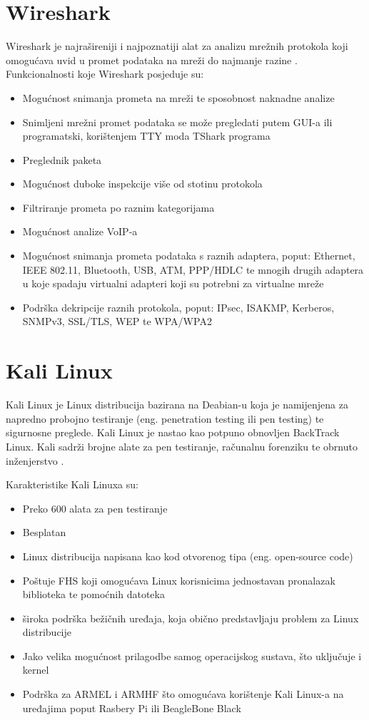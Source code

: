 \documentclass[12pt, oneside, onecolumn]{book}
\begin{document}
{\pagebreak

\section{Wireshark}

Wireshark je najrašireniji i najpoznatiji alat za analizu mrežnih protokola koji omogućava uvid u promet podataka na mreži do najmanje razine \cite{wsh}. Funkcionalnosti koje Wireshark posjeduje su:

\begin{itemize}
\item Mogućnost snimanja prometa na mreži te sposobnost naknadne analize
\item Snimljeni mrežni promet podataka se može pregledati putem GUI-a ili programatski, korištenjem TTY moda TShark programa
\item Preglednik paketa
\item Mogućnost duboke inspekcije više od stotinu protokola
\item Filtriranje prometa po raznim kategorijama
\item Mogućnost analize VoIP-a
\item Mogućnost snimanja prometa podataka s raznih adaptera, poput: Ethernet, IEEE 802.11, Bluetooth, USB, ATM, PPP/HDLC te mnogih drugih adaptera u koje spadaju virtualni adapteri koji su potrebni za virtualne mreže
\item Podrška dekripcije raznih protokola, poput: IPsec, ISAKMP, Kerberos, SNMPv3, SSL/TLS, WEP te WPA/WPA2
\end{itemize}

\pagebreak

\section{Kali Linux}
Kali Linux je Linux distribucija bazirana na Deabian-u koja je namijenjena za napredno probojno testiranje (eng. penetration testing ili pen testing) te sigurnosne preglede. 
Kali Linux je nastao kao potpuno obnovljen BackTrack Linux. Kali sadrži brojne alate za pen testiranje, računalnu forenziku te obrnuto inženjerstvo \cite{kali}.

Karakteristike Kali Linuxa su:

\begin{itemize}
\item Preko 600 alata za pen testiranje
\item Besplatan
\item Linux distribucija napisana kao kod otvorenog tipa (eng. open-source code)
\item Poštuje FHS koji omogućava Linux korisnicima jednostavan pronalazak biblioteka te pomoćnih datoteka
\item široka podrška bežičnih uređaja, koja obično predstavljaju problem za Linux distribucije
\item Jako velika mogućnost prilagodbe samog operacijskog sustava, što uključuje i kernel
\item Podrška za ARMEL i ARMHF što omogućava korištenje Kali Linux-a na uređajima poput Rasbery Pi ili BeagleBone Black
\end{itemize}

}
\end{document}
